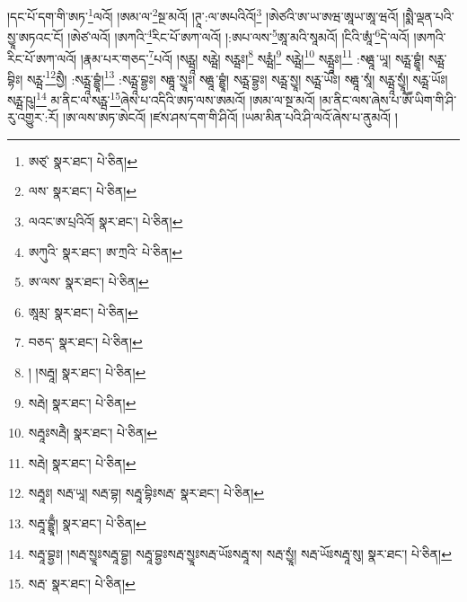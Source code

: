 །དང་པོ་དག་གི་ཨཏ་\footnote{ཨཙ྄་  སྣར་ཐང་།  པེ་ཅིན། }ལའོ། །ཨམ་ལ་\footnote{ལས་  སྣར་ཐང་།  པེ་ཅིན། }སྔ་མའོ། །ཊཱ་:ལ་ཨཔའིའོ།\footnote{ལའང་ཨ་པྲའིའོ།  སྣར་ཐང་།  པེ་ཅིན། } །ཨེཙའི་ཨ་ཡ་ཨཝ་ཨཱཡ་ཨཱ་ཝའོ། །སྨཻ་ལྡན་པའི་སྱཱ་ཨཏའང་ངོ། །ཨེཙ་ལའོ། །ཨཀའི་\footnote{ཨཀུའི་  སྣར་ཐང་། ཨ་ཀྲའི་  པེ་ཅིན། }རིང་པོ་ཨཀ་ལའོ། །:ཨཔ་ལས་\footnote{ཨ་ལས་  སྣར་ཐང་།  པེ་ཅིན། }ཨཱ་མའི་སཱམའོ། །ངིའི་ཨཱཾ་\footnote{ཨཱམྲ་  སྣར་ཐང་།  པེ་ཅིན། }དེ་ལའོ། །ཨཀའི་རིང་པོ་ཨཀ་ལའོ། །རྣམ་པར་གཅད་\footnote{བཅད་  སྣར་ཐང་།  པེ་ཅིན། }པའོ། །སཪྺཱ། སཪྺེ། སཪྺཿ།\footnote{། །སརྦཱ།  སྣར་ཐང་།  པེ་ཅིན། } སཪྺཾ།\footnote{སརྦེ།  སྣར་ཐང་།  པེ་ཅིན། } སཪྺེ།\footnote{སརྦཱཿསརྦཻ།  སྣར་ཐང་།  པེ་ཅིན། } སཪྺཱཿ།\footnote{སརྦེ།  སྣར་ཐང་།  པེ་ཅིན། } :སརྺཱ་ཡཱ། སཪྺ་བྷྱཱཾ། སཪྺ་བྷིཿ། སཪྺ་\footnote{སརྦཱཿ། སརྦ་ཡཱ། སརྦ་བྷ། སརྦཱ་བྷིཿསརྦ་  སྣར་ཐང་།  པེ་ཅིན། }སྱཻ། :སཪྺཱ་བྷྱཱཾ།\footnote{སརྦཱ་བྷྱཱྃ།  སྣར་ཐང་།  པེ་ཅིན། } :སཪྺཱ་བྷྱཿ། སརྺཱ་སྱཱཿ། སརྺཱ་བྷྱཱཾ། སཪྺ་བྷྱཿ། སཪྺ་སྱཱ། སཪྺ་ཡོཿ། སརྺཱ་སཱཾ། སཪྺཱ་སྱཱཾ། སཪྺ་ཡོཿ། སཪྺ་ཥུ།\footnote{སརྦཱ་བྷྱཿ། །སརྦ་སྱཱཿསརྦཱ་བྷྱ། སརྦཱ་བྷྱཿསརྦ་སྱཱཿསརྦ་ཡོཿསརྦཱ་ས། སརྦ་སྱཱཾ། སརྦ་ཡོཿསརྦཱ་སུ།  སྣར་ཐང་།  པེ་ཅིན། } མ་ནིང་ལ་སཪྺ་\footnote{སརྦ་  སྣར་ཐང་།  པེ་ཅིན། }ཞེས་པ་འདིའི་ཨཏ་ལས་ཨམའོ། །ཨམ་ལ་སྔ་མའོ། །མ་ནིང་ལས་ཞེས་པ་ཨཽ་ཡིག་གི་ཤི་རུ་འགྱུར་:རོ། །ཨ་ལས་ཨཏ་ཨེངའོ། །ཛས་ཤས་དག་གི་ཤིའོ། །ཡམ་མིན་པའི་ཤི་ལའོ་ཞེས་པ་ནུམའོ། །
